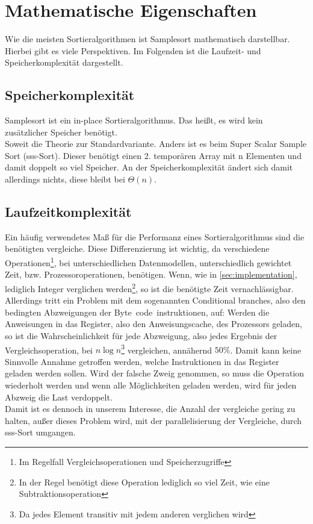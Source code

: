 \section{Mathematische Eigenschaften}
	Wie die meisten Sortieralgorithmen ist Samplesort mathematisch darstellbar.
	Hierbei gibt es viele Perspektiven.
	Im Folgenden ist die Laufzeit- und Speicherkomplexität dargestellt.
	
	\subsection{Speicherkomplexität}
		Samplesort ist ein in-place Sortieralgorithmus.
		Das heißt, es wird kein zusätzlicher Speicher benötigt.\\
		Soweit die Theorie zur Standardvariante.
		Anders ist es beim Super Scalar Sample Sort (sss-Sort). \autocite{sanders-2004} 
		Dieser benötigt einen 2. temporären Array mit n Elementen und damit doppelt so viel Speicher.
		An der Speicherkomplexität ändert sich damit allerdings nichts, diese bleibt bei $\Theta(n)$.
	\subsection{Laufzeitkomplexität}
		Ein häufig verwendetes Maß für die Performanz eines Sortieralgorithmus sind die benötigten vergleiche.
		Diese Differenzierung ist wichtig, da verschiedene Operationen\footnote{Im Regelfall Vergleichsoperationen und Speicherzugriffe}, bei unterschiedlichen Datenmodellen, unterschiedlich gewichtet Zeit, bzw. Prozessoroperationen, benötigen.
		Wenn, wie in \ref{sec:implementation}, lediglich Integer verglichen werden\footnote{In der Regel benötigt diese Operation lediglich so viel Zeit, wie eine Subtraktionsoperation}, so ist die benötigte Zeit vernachlässigbar.
		Allerdings tritt ein Problem mit dem sogenannten Conditional branches, also den bedingten Abzweigungen der Byte~code~instruktionen, auf:
		Werden die Anweisungen in das Register, also den Anweisungscache, des Prozessors geladen, so ist die Wahrscheinlichkeit für jede Abzweigung, also jedes Ergebnis der Vergleichsoperation, bei $n\log{n}$\footnote{Da jedes Element transitiv mit jedem anderen verglichen wird} vergleichen, annähernd $50\%$.
		Damit kann keine Sinnvolle Annahme getroffen werden, welche Instruktionen in das Register geladen werden sollen.
		Wird der falsche Zweig genommen, so muss die Operation wiederholt werden und wenn alle Möglichkeiten geladen werden, wird für jeden Abzweig die Last verdoppelt. \autocite{sanders-2004}\\
		Damit ist es dennoch in unserem Interesse, die Anzahl der vergleiche gering zu halten, außer dieses Problem wird, mit der parallelisierung der Vergleiche, durch sss-Sort umgangen.
		
